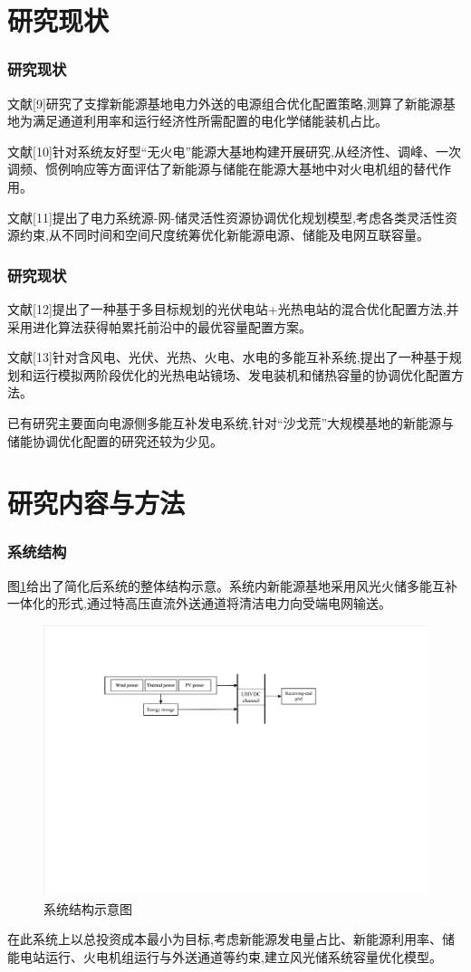 \documentclass{beamer}
\begin{document}
\section{研究现状}

\begin{frame}
	\frametitle{研究现状} 
    文献[9]研究了支撑新能源基地电力外送的电源组合优化配置策略,测算了新能源基地为满足通道利用率和运行经济性所需配置的电化学储能装机占比。
	
	文献[10]针对系统友好型“无火电”能源大基地构建开展研究,从经济性、调峰、一次调频、惯例响应等方面评估了新能源与储能在能源大基地中对火电机组的替代作用。
	
	文献[11]提出了电力系统源-网-储灵活性资源协调优化规划模型,考虑各类灵活性资源约束,从不同时间和空间尺度统筹优化新能源电源、储能及电网互联容量。
\end{frame}

\begin{frame}
	\frametitle{研究现状} 
	文献[12]提出了一种基于多目标规划的光伏电站+光热电站的混合优化配置方法,并采用进化算法获得帕累托前沿中的最优容量配置方案。
	
	文献[13]针对含风电、光伏、光热、火电、水电的多能互补系统,提出了一种基于规划和运行模拟两阶段优化的光热电站镜场、发电装机和储热容量的协调优化配置方法。

	已有研究主要面向电源侧多能互补发电系统,针对“沙戈荒”大规模基地的新能源与储能协调优化配置的研究还较为少见。
\end{frame}

\section{研究内容与方法}

\begin{frame}
	\frametitle{系统结构} 
	图\ref*{fig.1}给出了简化后系统的整体结构示意。系统内新能源基地采用风光火储多能互补一体化的形式,通过特高压直流外送通道将清洁电力向受端电网输送。
	\begin{figure}[htbp]  
		\centering  
		\includegraphics[scale=0.6]{./pic/系统结构示意图.pdf}
		\caption{系统结构示意图}
		\label{fig.1}
	\end{figure}
	在此系统上以总投资成本最小为目标,考虑新能源发电量占比、新能源利用率、储能电站运行、火电机组运行与外送通道等约束,建立风光储系统容量优化模型。
\end{frame}
\end{document}
